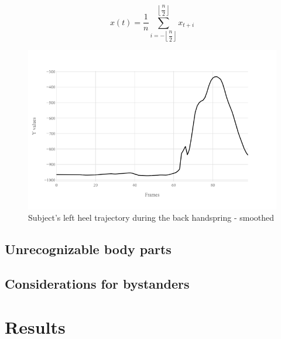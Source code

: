 \begin{equation}
\label{moving-average-smoothing-formula}
x(t) = \dfrac{1}{n}\sum\limits_{i=-\left\lfloor{\dfrac{n}{2}}\right\rfloor}^{\left\lfloor{\dfrac{n}{2}}\right\rfloor}x_{t+i}
\end{equation}

\begin{figure}[htb]
  \centering
    \includegraphics[width=\textwidth,keepaspectratio]
    {images/data-preprocessing/flack-17-rasmus-l-heel-y-smoothed}
    \caption{Subject's left heel trajectory during the back handspring - smoothed}
    \label{lack-17-rasmus-l-heel-y-smoothed}
\end{figure}

\subsection{Unrecognizable body parts}

\subsection{Considerations for bystanders}

\section{Results}
\label{pre-processing-results}



